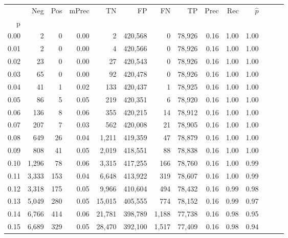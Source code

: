 \begin{tabular}{rrrrrrrrrrrrrr}
\toprule
{} &     Neg &    Pos & mPrec &       TN &       FP &      FN &      TP &  Prec &   Rec & $\hat{p}$ \\
p    &         &        &       &          &          &         &         &       &       &           \\
\midrule
0.00 &       2 &      0 &  0.00 &        2 &  420,568 &       0 &  78,926 &  0.16 &  1.00 &      1.00 \\
0.01 &       2 &      0 &  0.00 &        4 &  420,566 &       0 &  78,926 &  0.16 &  1.00 &      1.00 \\
0.02 &      23 &      0 &  0.00 &       27 &  420,543 &       0 &  78,926 &  0.16 &  1.00 &      1.00 \\
0.03 &      65 &      0 &  0.00 &       92 &  420,478 &       0 &  78,926 &  0.16 &  1.00 &      1.00 \\
0.04 &      41 &      1 &  0.02 &      133 &  420,437 &       1 &  78,925 &  0.16 &  1.00 &      1.00 \\
0.05 &      86 &      5 &  0.05 &      219 &  420,351 &       6 &  78,920 &  0.16 &  1.00 &      1.00 \\
0.06 &     136 &      8 &  0.06 &      355 &  420,215 &      14 &  78,912 &  0.16 &  1.00 &      1.00 \\
0.07 &     207 &      7 &  0.03 &      562 &  420,008 &      21 &  78,905 &  0.16 &  1.00 &      1.00 \\
0.08 &     649 &     26 &  0.04 &    1,211 &  419,359 &      47 &  78,879 &  0.16 &  1.00 &      1.00 \\
0.09 &     808 &     41 &  0.05 &    2,019 &  418,551 &      88 &  78,838 &  0.16 &  1.00 &      1.00 \\
0.10 &   1,296 &     78 &  0.06 &    3,315 &  417,255 &     166 &  78,760 &  0.16 &  1.00 &      0.99 \\
0.11 &   3,333 &    153 &  0.04 &    6,648 &  413,922 &     319 &  78,607 &  0.16 &  1.00 &      0.99 \\
0.12 &   3,318 &    175 &  0.05 &    9,966 &  410,604 &     494 &  78,432 &  0.16 &  0.99 &      0.98 \\
0.13 &   5,049 &    280 &  0.05 &   15,015 &  405,555 &     774 &  78,152 &  0.16 &  0.99 &      0.97 \\
0.14 &   6,766 &    414 &  0.06 &   21,781 &  398,789 &   1,188 &  77,738 &  0.16 &  0.98 &      0.95 \\
0.15 &   6,689 &    329 &  0.05 &   28,470 &  392,100 &   1,517 &  77,409 &  0.16 &  0.98 &      0.94 \\

\end{tabular}
